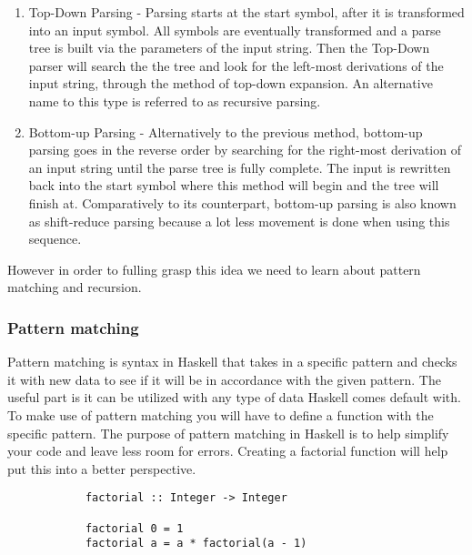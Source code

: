 \documentclass{article}
\begin{document}
    \begin{enumerate}
        \item Top-Down Parsing - Parsing starts at the start symbol, after it is transformed into an input symbol. All symbols are eventually transformed and a parse tree is built via the parameters of the input string. Then the Top-Down parser will search the the tree and look for the left-most derivations of the input string, through the method of top-down expansion. An alternative name to this type is referred to as recursive parsing.
        \item Bottom-up Parsing - Alternatively to the previous method, bottom-up parsing goes in the reverse order by searching for the right-most derivation of an input string until the parse tree is fully complete. The input is rewritten back into the start symbol where this method will begin and the tree will finish at. Comparatively to its counterpart, bottom-up parsing is also known as shift-reduce parsing because a lot less movement is done when using this sequence.
        
    \end{enumerate}
    
    \noindent However in order to fulling grasp this idea we need to learn about pattern matching and recursion.
        
        \subsubsection{Pattern matching}
        Pattern matching is syntax in Haskell that takes in a specific pattern and checks it with new data to see if it will be in accordance with the given pattern. The useful part is it can be utilized with any type of data Haskell comes default with. To make use of pattern matching you will have to define a function with the specific pattern. The purpose of pattern matching in Haskell is to help simplify your code and leave less room for errors. Creating a factorial function will help put this into a better perspective. 
        
        \begin{lstlisting}
            factorial :: Integer -> Integer 
            
            factorial 0 = 1
            factorial a = a * factorial(a - 1)
        \end{lstlisting}
        
\end{document}
